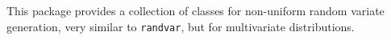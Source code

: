 
This package provides a collection of classes for non-uniform 
random variate generation, very similar to \texttt{randvar}, 
but for multivariate distributions.

